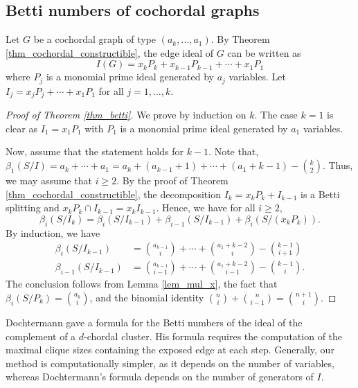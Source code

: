 \documentclass[12pt,amscd]{amsart}
\theoremstyle{definition}
\numberwithin{equation}{section}
\begin{document}
\subsection{Betti numbers of cochordal graphs} Let $G$ be a cochordal graph of type $(a_k, \ldots, a_1)$. By Theorem \ref{thm_cochordal_constructible}, the edge ideal of $G$ can be written as 
$$I(G) = x_kP_k + x_{k-1}P_{k-1} + \cdots +x_1P_1$$
where $P_j$ is a monomial prime ideal generated by $a_j$ variables. Let $I_j = x_{j} P_j + \cdots + x_1 P_1$ for all $j = 1,\ldots, k$.


\begin{proof}[Proof of Theorem \ref{thm_betti}]
    We prove by induction on $k$. The case $k = 1$ is clear as $I_1 = x_1P_1$ with $P_1$ is a monomial prime ideal generated by $a_1$ variables. 

Now, assume that the statement holds for $k-1$. Note that, $\beta_1(S/I) = a_k + \cdots +a_1 = a_k + (a_{k-1} + 1) + \cdots + (a_1 + k-1) - \binom{k}{2}.$ Thus, we may assume that $i \ge 2$. By the proof of Theorem \ref{thm_cochordal_constructible}, the decomposition $I_k = x_kP_k + I_{k-1}$ is a Betti splitting and $x_k P_k \cap I_{k-1} = x_kI_{k-1}$. Hence, we have for all $i \ge 2$,
    $$\beta_i(S/I_k) = \beta_i(S/I_{k-1}) + \beta_{i-1}(S/I_{k-1}) + \beta_i(S/(x_kP_k)).$$
    By induction, we have 
\begin{align*}
    \beta_i(S/I_{k-1}) &= \binom{a_{k-1}}{i} +  \cdots + \binom{a_1 + k-2}{i}  - \binom{k-1}{i+1} \\
    \beta_{i-1} (S/I_{k-1}) &= \binom{a_{k-1}}{i-1} + \cdots +  \binom{a_1 + k-2}{i-1} -\binom{k-1}{i}.
\end{align*}    
The conclusion follows from Lemma \ref{lem_mul_x}, the fact that $\beta_i(S/P_k) = \binom{a_k}{i}$, and the binomial identity $\binom{n}{i} + \binom{n}{i-1} = \binom{n+1}{i}$.
\end{proof}

Dochtermann \cite{Doc} gave a formula for the Betti numbers of the ideal of the complement of a $d$-chordal cluster. His formula requires the computation of the maximal clique sizes containing the exposed edge at each step. Generally, our method is computationally simpler, as it depends on the number of variables, whereas Dochtermann's formula depends on the number of generators of $I$.    
\end{document}
